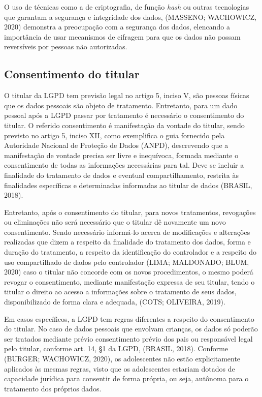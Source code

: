 \documentclass[
	12pt,				%
	openright,			%
	oneside,			%
	a4paper,			%
	english,			%
	french,				%
	spanish,			%
	brazil,				%
	]{abntex2}
\begin{document}
O uso de técnicas como a de criptografia, de função \textit{hash} ou outras tecnologias que garantam a segurança e integridade dos dados, (MASSENO; WACHOWICZ, 2020) demonstra a preocupação com a segurança dos dados, elencando a importância de usar mecanismos de cifragem para que os dados não possam reversíveis por pessoas não autorizadas.

\subsection{Consentimento do titular}

O titular da LGPD tem previsão legal no artigo 5, inciso V, são pessoas físicas que os dados pessoais são objeto de tratamento. Entretanto, para um dado pessoal após a LGPD passar por tratamento é necessário o consentimento do titular. O referido consentimento é manifestação da vontade do titular, sendo previsto no artigo 5, inciso XII, como exemplifica o guia fornecido pela Autoridade Nacional de Proteção de Dados (ANPD), descrevendo que a manifestação de vontade precisa ser livre e inequívoca, formada mediante o consentimento de todas as informações necessárias para tal. Deve se incluir a finalidade do tratamento de dados e eventual compartilhamento, restrita às finalidades específicas e determinadas informadas ao titular de dados (BRASIL, 2018).

Entretanto, após o consentimento do titular, para novos tratamentos, revogações ou eliminações não será necessário que o titular dê novamente um novo consentimento. Sendo necessário informá-lo acerca de modificações e alterações realizadas que dizem a respeito da finalidade do tratamento dos dados, forma e duração do tratamento, a respeito da identificação do controlador e a respeito do uso compartilhado de dados pelo controlador (LIMA; MALDONADO; BLUM, 2020) caso o titular não concorde com os novos procedimentos, o mesmo poderá revogar o consentimento, mediante manifestação expressa de seu titular, tendo o titular o direito ao acesso a informações sobre o tratamento de seus dados, disponibilizado de forma clara e adequada, (COTS; OLIVEIRA, 2019).

Em casos específicos, a LGPD tem regras diferentes a respeito do consentimento do titular. No caso de dados pessoais que envolvam crianças, os dados só poderão ser tratados mediante prévio consentimento prévio dos pais ou responsável legal pelo titular, conforme art. 14, §1 da LGPD, (BRASIL, 2018). Conforme (BURGER; WACHOWICZ, 2020), os adolescentes não estão explicitamente aplicados às mesmas regras, visto que os adolescentes estariam dotados de capacidade jurídica para consentir de forma própria, ou seja, autônoma para o tratamento dos próprios dados.
\end{document}
